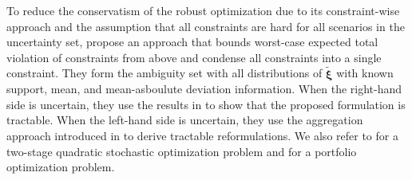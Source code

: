 \documentclass[final,onefignum,onetabnum]{class}
\makeatletter
\renewcommand\paragraph{\@startsection{paragraph}{4}{\z@}%
  {3.25ex \@plus1ex \@minus.2ex}%
  {-1em}%
  {\normalfont\normalsize\bfseries}}
\newcommand{\bs}[1]{\boldsymbol{#1}} %
\newcommand{\txi}{\tilde{\bs{\xi}}}
\makeatother
\begin{document}
To reduce the conservatism of the robust optimization due to its constraint-wise approach and the  assumption that all constraints are hard for all scenarios in the uncertainty set, \citet{roos2018reducing} propose an approach that bounds worst-case expected total violation of constraints  from above and condense all constraints into a single constraint. They form the ambiguity set with all distributions of $\txi$ with known support, mean, and mean-asboulute deviation information. When the right-hand side is uncertain, they use the results in \citet{postek2018} to show that the proposed formulation is tractable. When the left-hand side is uncertain, they use the aggregation approach introduced in \citet{postek2018} to derive tractable reformulations. 
We also refer to \citet{sun2018} for a two-stage quadratic stochastic optimization problem and 
\citet{demiguel2009portfolio} for a portfolio optimization problem. 

\end{document}
